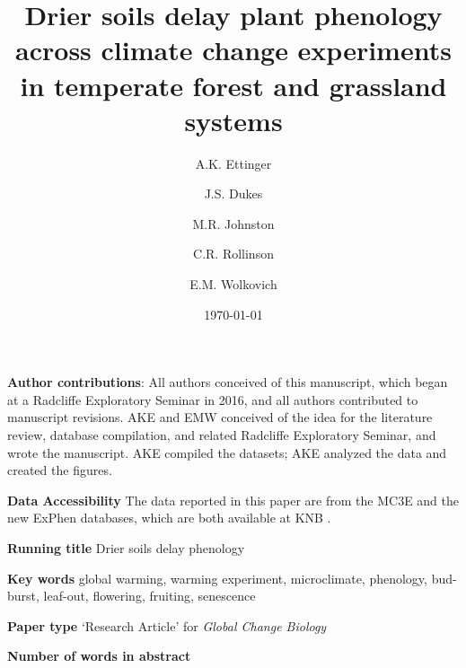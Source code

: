 \documentclass{article}
\begin{document}



\title{Drier soils delay plant phenology across climate change experiments in temperate forest and grassland systems} 
\author[1,2,a]{A.K. Ettinger}
\author[3,b]{J.S. Dukes}
\author[4,c]{M.R. Johnston}
\author[5,d]{C.R. Rollinson}
\author[1,4,6,e]{E.M. Wolkovich}









\date{\today}
\maketitle 
\textbf{Author contributions}: All authors conceived of this manuscript, which began at a Radcliffe Exploratory Seminar in 2016, and all authors contributed to manuscript revisions. AKE and EMW conceived of the idea for the literature review, database compilation, and related Radcliffe Exploratory Seminar, and wrote the manuscript. AKE compiled the datasets; AKE analyzed the data and created the figures.

\textbf{Data Accessibility} 
The data reported in this paper are from the MC3E and the new ExPhen databases, which are both available at KNB \citep{ettinger2018,ettinger2022}. 

\textbf{Running title} Drier soils delay phenology

\textbf{Key words} global warming, warming experiment, microclimate, phenology, bud-burst, leaf-out, flowering, fruiting, senescence 


\textbf{Paper type} `Research Article' for \textit{Global Change Biology} %

\textbf{Number of words in abstract} 
\end{document}
